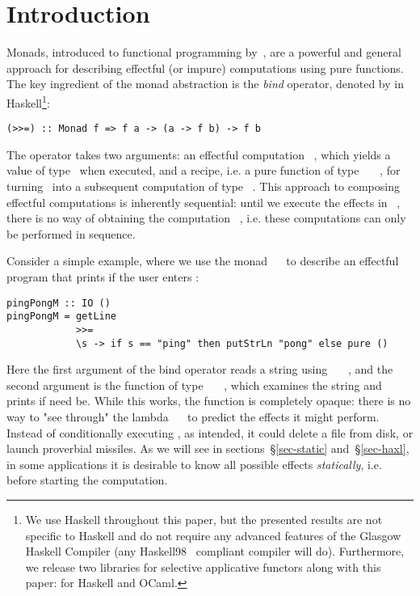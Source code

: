 \section{Introduction}\label{sec-intro}


Monads, introduced to functional programming by~\citet{1995_wadler_monads}, are
a powerful and general approach for describing effectful (or impure)
computations using pure functions. The key ingredient of the monad abstraction
is the \emph{bind} operator, denoted by \hs{>>=} in
Haskell\footnote{We use Haskell throughout this paper, but the presented results
are not specific to Haskell and do not require any advanced features of the
Glasgow Haskell Compiler (any Haskell98~\citep{haskell98} compliant compiler
will do). Furthermore, we release two libraries for selective applicative
functors along with this paper: for Haskell and OCaml.}:

\vspace{1mm}
\begin{verbatim}
(>>=) :: Monad f => f a -> (a -> f b) -> f b
\end{verbatim}
\vspace{1mm}

\noindent
The operator takes two arguments: an effectful computation ~, which
yields a value of type~ when executed, and a recipe, i.e. a pure function
of type ~\hs{->}~~, for turning~ into a subsequent
computation of type ~. This approach to composing effectful
computations is inherently sequential: until we execute the effects in
~, there is no way of obtaining the computation ~,
i.e. these computations can only be performed in sequence.

Consider a simple example, where we use the monad ~\hs{=}~ to
describe an effectful program that prints  if the user enters
:

\vspace{1mm}
\begin{verbatim}
pingPongM :: IO ()
pingPongM = getLine
            >>=
            \s -> if s == "ping" then putStrLn "pong" else pure ()
\end{verbatim}
\vspace{1mm}

\noindent
Here the first argument of the bind operator reads a string using
~\hs{::}~~, and the second argument is the
function of type ~\hs{->}~~\hs{()}, which examines the string
and prints  if need be. While this works, the function is completely
opaque: there is no way to "see through" the lambda \hs{\s}~\hs{->}~ to
predict the effects it might perform. Instead of conditionally executing
, as intended, it could delete a file from disk, or launch
proverbial missiles. As we will see in sections~\S\ref{sec-static}
and~\S\ref{sec-haxl}, in some applications it is desirable to know all possible
effects \emph{statically}, i.e. before starting the computation.

